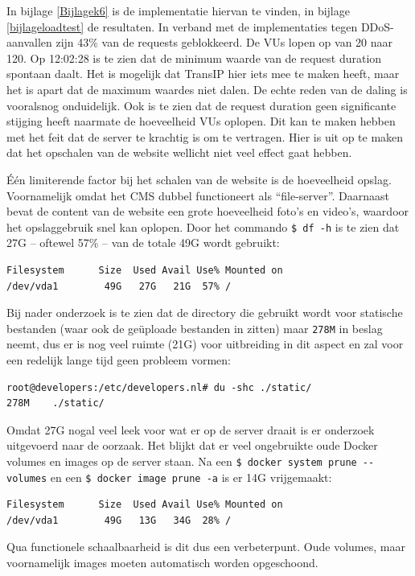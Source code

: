 In bijlage \ref{Bijlagek6} is de implementatie hiervan te vinden, in bijlage \ref{bijlageloadtest} de resultaten. In verband met de implementaties tegen DDoS-aanvallen zijn 43\% van de requests geblokkeerd. De VUs lopen op van 20 naar 120. Op 12:02:28 is te zien dat de minimum waarde van de request duration spontaan daalt. Het is mogelijk dat TransIP hier iets mee te maken heeft, maar het is apart dat de maximum waardes niet dalen. De echte reden van de daling is vooralsnog onduidelijk. Ook is te zien dat de request duration geen significante stijging heeft naarmate de hoeveelheid VUs oplopen. Dit kan te maken hebben met het feit dat de server te krachtig is om te vertragen. Hier is uit op te maken dat het opschalen van de website wellicht niet veel effect gaat hebben.

Één limiterende factor bij het schalen van de website is de hoeveelheid opslag. Voornamelijk omdat het CMS dubbel functioneert als \enquote{file-server}. Daarnaast bevat de content van de website een grote hoeveelheid foto's en video's, waardoor het opslaggebruik snel kan oplopen. Door het commando \texttt{\$ df -h} is te zien dat 27G -- oftewel 57\% -- van de totale 49G wordt gebruikt:
\begin{verbatim}
Filesystem      Size  Used Avail Use% Mounted on
/dev/vda1        49G   27G   21G  57% /
\end{verbatim}
Bij nader onderzoek is te zien dat de directory die gebruikt wordt voor statische bestanden (waar ook de geüploade bestanden in zitten) maar \texttt{278M} in beslag neemt, dus er is nog veel ruimte (21G) voor uitbreiding in dit aspect en zal voor een redelijk lange tijd geen probleem vormen:
\begin{verbatim}
root@developers:/etc/developers.nl# du -shc ./static/
278M	./static/
\end{verbatim}

Omdat 27G nogal veel leek voor wat er op de server draait is er onderzoek uitgevoerd naar de oorzaak. Het blijkt dat er veel ongebruikte oude Docker volumes en images op de server staan. Na een \texttt{\$ docker system prune -\--volumes} en een \texttt{\$ docker image prune -a} is er 14G vrijgemaakt:
\begin{verbatim}
Filesystem      Size  Used Avail Use% Mounted on
/dev/vda1        49G   13G   34G  28% /
\end{verbatim}
Qua functionele schaalbaarheid is dit dus een verbeterpunt. Oude volumes, maar voornamelijk images moeten automatisch worden opgeschoond.

